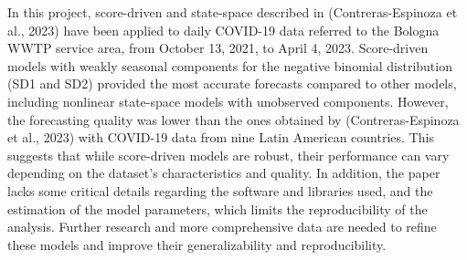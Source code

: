 In this project, score-driven and state-space described in (Contreras-Espinoza et al., 2023) have been applied to daily COVID-19 data referred to the Bologna WWTP service area, from October 13, 2021, to April 4, 2023. Score-driven models with weakly seasonal components for the negative binomial distribution (SD1 and SD2) provided the most accurate forecasts compared to other models, including nonlinear state-space models with unobserved components. However, the forecasting quality was lower than the ones obtained by (Contreras-Espinoza et al., 2023) with COVID-19 data from nine Latin American countries. This suggests that while score-driven models are robust, their performance can vary depending on the dataset's characteristics and quality. In addition, the paper lacks some critical details regarding the software and libraries used, and the estimation of the model parameters, which limits the reproducibility of the analysis. Further research and more comprehensive data are needed to refine these models and improve their generalizability and reproducibility.
